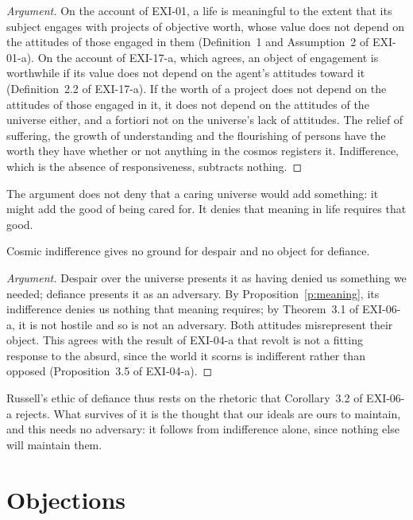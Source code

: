 \documentclass{situationist-preprint}
\begin{document}
\begin{proof}[Argument]
On the account of EXI-01, a life is meaningful to the extent that its subject engages with projects of objective worth, whose value does not depend on the attitudes of those engaged in them (Definition~1 and Assumption~2 of EXI-01-a). On the account of EXI-17-a, which agrees, an object of engagement is worthwhile if its value does not depend on the agent's attitudes toward it (Definition~2.2 of EXI-17-a). If the worth of a project does not depend on the attitudes of those engaged in it, it does not depend on the attitudes of the universe either, and a fortiori not on the universe's lack of attitudes. The relief of suffering, the growth of understanding and the flourishing of persons have the worth they have whether or not anything in the cosmos registers it. Indifference, which is the absence of responsiveness, subtracts nothing.
\end{proof}

The argument does not deny that a caring universe would add something: it might add the good of being cared for. It denies that meaning in life requires that good.

\begin{proposition}\label{p:despair}
Cosmic indifference gives no ground for despair and no object for defiance.
\end{proposition}

\begin{proof}[Argument]
Despair over the universe presents it as having denied us something we needed; defiance presents it as an adversary. By Proposition~\ref{p:meaning}, its indifference denies us nothing that meaning requires; by Theorem~3.1 of EXI-06-a, it is not hostile and so is not an adversary. Both attitudes misrepresent their object. This agrees with the result of EXI-04-a that revolt is not a fitting response to the absurd, since the world it scorns is indifferent rather than opposed (Proposition~3.5 of EXI-04-a).
\end{proof}

Russell's ethic of defiance thus rests on the rhetoric that Corollary~3.2 of EXI-06-a rejects. What survives of it is the thought that our ideals are ours to maintain, and this needs no adversary: it follows from indifference alone, since nothing else will maintain them.

\section{Objections}
\end{document}
